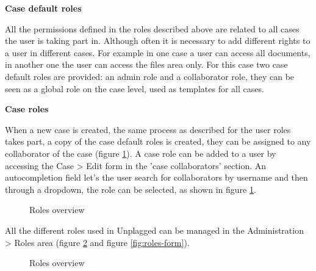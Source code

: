 \textbf{Case default roles}

All the permissions defined in the roles described above are related to all cases the user is taking part in. Although often it is necessary to add different rights to a user in different cases. For example in one case a user can access all documents, in another one the user can access the files area only. For this case two case default roles are provided: an admin role and a collaborator role, they can be seen as a global role on the case level, used as templates for all cases. 

\textbf{Case roles}

When a new case is created, the same process as described for the user roles takes part, a copy of the case default roles is created, they can be assigned to any collaborator of the case (figure \ref{fig:collaborators-form}). A case role can be added to a user by accessing the Case > Edit form in the 'case collaborators' section. An autocompletion field let's the user search for collaborators by username and then through a dropdown, the role can be selected, as shown in figure \ref{fig:collaborators-form}.

\begin{figure}[!h]
  \centering
  \caption{Roles overview}
  \label{fig:collaborators-form}
\end{figure}

All the different roles used in Unplagged can be managed in the Administration > Roles area (figure \ref{fig:roles-list} and figure \ref{fig:roles-form}).

\begin{figure}[!h]
  \centering
  \caption{Roles overview}
  \label{fig:roles-list}
\end{figure}


